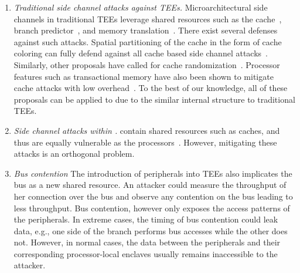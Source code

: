 \begin{enumerate}
  
\item \emph{Traditional side channel attacks against TEEs.}
Microarchitectural side channels in traditional TEEs leverage shared resources such as the cache~\cite{brasser2017software}, branch predictor~\cite{lee2017inferring}, and memory translation~\cite{xu2015controlled}. There exist several defenses against such attacks. Spatial partitioning of the cache in the form of cache coloring can fully defend against all cache based side channel attacks~\cite{costan2016sanctum,zhang2009cachecoloring,zhaosonicboom}. Similarly, other proposals have called for cache randomization~\cite{brasser2019dr,werner2019scattercache}. Processor features such as transactional memory have also been shown to mitigate cache attacks with low overhead~\cite{gruss2017strongsidechannel}. To the best of our knowledge, all of these proposals can be applied to \name{} due to the similar internal structure to traditional TEEs.


\item \emph{Side channel attacks within \sphw.}
\Sphw contain shared resources such as caches, and thus are equally vulnerable as the processors~\cite{naghibijouybari2018rendered,ramesh2018fpga,visor}. However, mitigating these attacks is an orthogonal problem.

\item \emph{Bus contention} The introduction of peripherals into TEEs also implicates the bus as a new shared resource. An attacker could measure the throughput of her connection over the bus and observe any contention on the bus leading to less throughput.
Bus contention, however only exposes the access patterns of the peripherals. In extreme cases, the timing of bus contention could leak data, e.g., one side of the branch performs bus accesses while the other does not. However, in normal cases, the data between the peripherals and their corresponding processor-local enclaves usually remains inaccessible to the attacker.

\end{enumerate}

